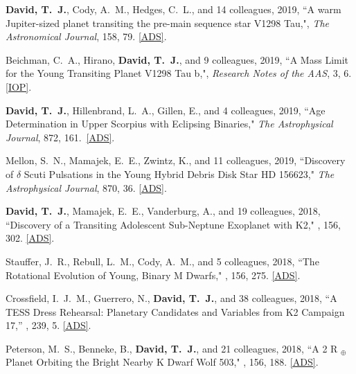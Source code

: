 \item {\bf {David}, T.~J.}, {Cody}, A.~M., {Hedges}, C.~L., and 14 colleagues, 2019, ``{A warm Jupiter-sized planet transiting the pre-main sequence star V1298 Tau},", \textit{The Astronomical Journal}, 158, 79. \href{https://ui.adsabs.harvard.edu/abs/2019AJ....158...79D/abstract}{[ADS]}.

\item {Beichman}, C.~A., {Hirano}, {\bf {David}, T.~J.}, and 9 colleagues, 2019, ``{A Mass Limit for the Young Transiting Planet V1298 Tau b},", \textit{Research Notes of the AAS}, 3, 6. \href{https://iopscience.iop.org/article/10.3847/2515-5172/ab2c9d}{[IOP]}.

\item {\bf {David}, T.~J.}, {Hillenbrand}, L.~A., {Gillen}, E., and 4 colleagues, 2019, ``{Age Determination in Upper Scorpius with Eclipsing Binaries}," \textit{The Astrophysical Journal}, 872, 161.\ \href{https://ui.adsabs.harvard.edu/abs/2019ApJ...872..161D/abstract}{[ADS]}.

\item {Mellon}, S.~N., {Mamajek}, E.~E., Zwintz, K., and 11 colleagues, 2019, ``{Discovery of $\delta$ Scuti Pulsations in the Young Hybrid Debris Disk Star HD 156623}," \textit{The Astrophysical Journal}, 870, 36. \href{https://ui.adsabs.harvard.edu/#abs/2019ApJ...870...36M/}{[ADS]}.

\item {\bf {David}, T.~J.}, {Mamajek}, E.~E., {Vanderburg}, A., and 19 colleagues, 2018, ``{Discovery of a Transiting Adolescent Sub-Neptune Exoplanet with K2}," \aj, 156, 302.  \href{https://ui.adsabs.harvard.edu/#abs/2018AJ....156..302D/}{[ADS]}. 

\item {Stauffer}, J.~R., {Rebull}, L.~M., {Cody}, A.~M., and 5 colleagues, 2018, ``{The Rotational Evolution of Young, Binary M Dwarfs}," \aj, 156, 275. \href{https://ui.adsabs.harvard.edu/abs/2018AJ....156..275S/abstract}{[ADS]}.

\item {Crossfield}, I.~J.~M., {Guerrero}, N., {\bf {David}, T.~J.}, and 38 colleagues, 2018, ``{A TESS Dress Rehearsal: Planetary Candidates and Variables from K2 Campaign 17},'' \apjs, 239, 5. \href{https://ui.adsabs.harvard.edu/#abs/2018arXiv180603127C}{[ADS]}.

\item {Peterson}, M.~S., {Benneke}, B., {\bf {David}, T.~J.}, and 21 colleagues, 2018, ``{A 2 R $_{{\ensuremath{\oplus}}}$ Planet Orbiting the Bright Nearby K Dwarf Wolf 503}," \aj, 156, 188. \href{https://ui.adsabs.harvard.edu/#abs/2018AJ....156..188P}{[ADS]}.

